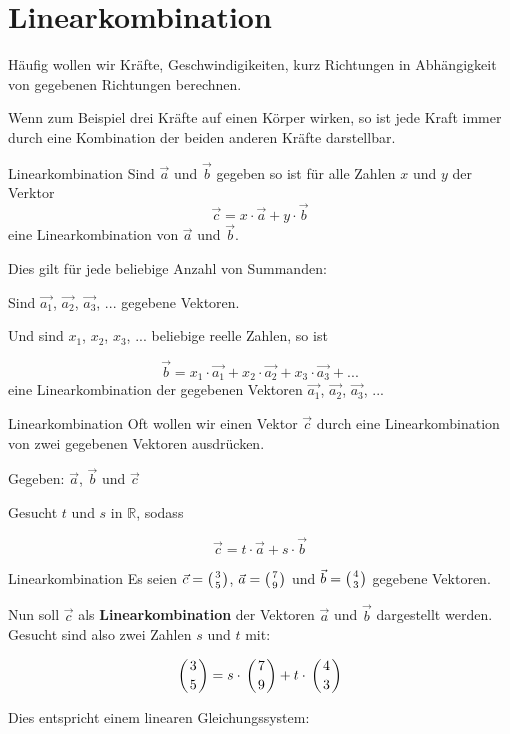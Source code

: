 \section{Linearkombination}


Häufig wollen wir Kräfte, Geschwindigikeiten, kurz Richtungen in
Abhängigkeit von gegebenen Richtungen berechnen.

Wenn zum Beispiel drei Kräfte auf einen Körper wirken, so ist jede
Kraft immer durch eine Kombination der beiden anderen Kräfte
darstellbar.

\begin{definition}{Linearkombination}{}
  Sind $\vec{a}$ und $\vec{b}$ gegeben so ist für alle Zahlen $x$ und
  $y$ der Verktor
  $$\vec{c} = x\cdot{}\vec{a} + y\cdot{}\vec{b}$$
  eine Linearkombination von $\vec{a}$ und $\vec{b}$.

  Dies gilt für jede beliebige Anzahl von Summanden:

  Sind $\vec{a_1}$, $\vec{a_2}$, $\vec{a_3}$, ... gegebene Vektoren.

  Und sind $x_1$, $x_2$, $x_3$, ... beliebige reelle Zahlen, so ist

  $$\vec{b} = x_1\cdot{}\vec{a_1} +  x_2\cdot{}\vec{a_2} +
  x_3\cdot{}\vec{a_3} + ...$$
  eine Linearkombination der gegebenen Vektoren $\vec{a_1}$, $\vec{a_2}$, $\vec{a_3}$, ... 
  \end{definition}


\begin{gesetz}{Linearkombination}{}
Oft wollen wir einen Vektor $\vec{c}$ durch eine Linearkombination von
zwei gegebenen Vektoren ausdrücken.

Gegeben: $\vec{a}$, $\vec{b}$ und $\vec{c}$

Gesucht $t$ und $s$ in $\mathbb{R}$, sodass

$$\vec{c} = t\cdot{}\vec{a} + s\cdot{}\vec{b}$$

\end{gesetz}

\begin{beispiel}{Linearkombination}{}
  Es seien $\vec{c} = \left(3 \atop 5\right)$, $\vec{a} = \left(7 \atop
  9\right)$ und $\vec{b} = \left(4 \atop 3\right)$ gegebene Vektoren.

  Nun soll $\vec{c}$ als \textbf{Linearkombination} der Vektoren
  $\vec{a}$ und $\vec{b}$ dargestellt werden. Gesucht sind also zwei
  Zahlen $s$ und $t$ mit:

  $$\left(3 \atop 5\right) = s\cdot{} \left(7 \atop 9\right) +
  t\cdot{} \left(4 \atop 3\right)$$

  Dies entspricht einem linearen Gleichungssystem:
\end{beispiel}

